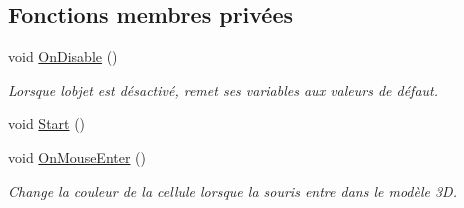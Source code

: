 \subsection*{Fonctions membres privées}
\begin{DoxyCompactItemize}
\item 
void \mbox{\hyperlink{class_edit_mode_cell_a2438766a46d0b93aba3e92340f51bd10}{On\+Disable}} ()
\begin{DoxyCompactList}\small\item\em Lorsque l\textquotesingle{}objet est désactivé, remet ses variables aux valeurs de défaut. \end{DoxyCompactList}\item 
void \mbox{\hyperlink{class_edit_mode_cell_a1bdddfef680e9c75c18773d958c9ae82}{Start}} ()
\item 
void \mbox{\hyperlink{class_edit_mode_cell_ac6101c61c85633c91eee689ebc72536f}{On\+Mouse\+Enter}} ()
\begin{DoxyCompactList}\small\item\em Change la couleur de la cellule lorsque la souris entre dans le modèle 3D. \end{DoxyCompactList}\end{DoxyCompactItemize}
